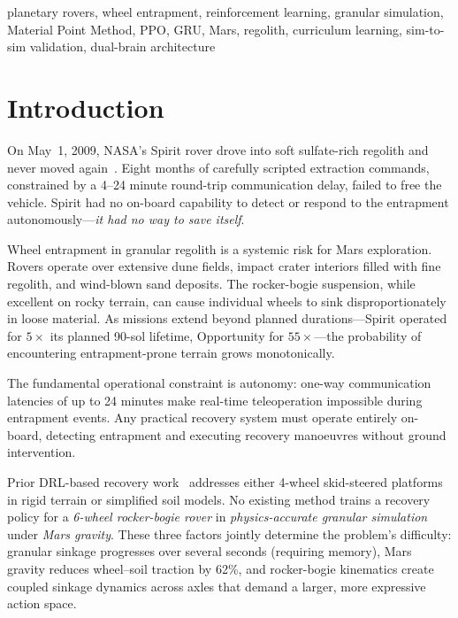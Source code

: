 \documentclass[conference]{IEEEtran}
\begin{document}
\begin{IEEEkeywords}
planetary rovers, wheel entrapment, reinforcement learning, granular simulation,
Material Point Method, PPO, GRU, Mars, regolith, curriculum learning,
sim-to-sim validation, dual-brain architecture
\end{IEEEkeywords}

\section{Introduction}
\label{sec:intro}

On May~1, 2009, NASA's Spirit rover drove into soft sulfate-rich regolith and
never moved again~\cite{arvidson2011spirit}. Eight months of carefully scripted
extraction commands, constrained by a 4--24 minute round-trip communication delay,
failed to free the vehicle. Spirit had no on-board capability to detect or respond
to the entrapment autonomously---\emph{it had no way to save itself}.

Wheel entrapment in granular regolith is a systemic risk for Mars exploration.
Rovers operate over extensive dune fields, impact crater interiors filled with
fine regolith, and wind-blown sand deposits. The rocker-bogie suspension, while
excellent on rocky terrain, can cause individual wheels to sink disproportionately
in loose material. As missions extend beyond planned durations---Spirit operated
for $5\times$ its planned 90-sol lifetime, Opportunity for $55\times$---the
probability of encountering entrapment-prone terrain grows monotonically.

The fundamental operational constraint is autonomy: one-way communication
latencies of up to 24 minutes make real-time teleoperation impossible during
entrapment events. Any practical recovery system must operate entirely on-board,
detecting entrapment and executing recovery manoeuvres without ground intervention.

Prior DRL-based recovery work~\cite{bi2026escape,jain2019} addresses either
4-wheel skid-steered platforms in rigid terrain or simplified soil models. No
existing method trains a recovery policy for a \emph{6-wheel rocker-bogie rover}
in \emph{physics-accurate granular simulation} under \emph{Mars gravity}. These
three factors jointly determine the problem's difficulty: granular sinkage
progresses over several seconds (requiring memory), Mars gravity reduces
wheel--soil traction by 62\%, and rocker-bogie kinematics create coupled sinkage
dynamics across axles that demand a larger, more expressive action space.
\end{document}
